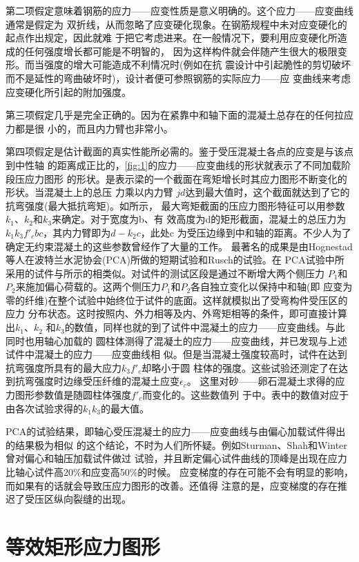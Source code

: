 \documentclass[12pt,a4paper]{book}
\begin{document}
第二项假定意味着钢筋的应力——应变性质是意义明确的。这个应力——应变曲线通常是假定为
双折线，从而忽略了应变硬化现象。在钢筋规程中未对应变硬化的起点作出规定，因此就难
于把它考虑进来。在一般情况下，要利用应变硬化所造成的任何强度增长都可能是不明智的，
因为这样构件就会伴随产生很大的极限变形。而当强度的增大可能造成不利情况时(例如在抗
震设计中引起脆性的剪切破坏而不是延性的弯曲破坏时)，设计者便可参照钢筋的实际应力——应
变曲线来考虑应变硬化所引起的附加强度。

第三项假定几乎是完全正确的。因为在紧靠中和轴下面的混凝土总存在的任何拉应力都是很
小的，而且内力臂也非常小。

第四项假定是估计截面的真实性能所必需的。鉴于受压混凝土各点的应变是与该点到中性轴
的距离成正比的，\cref{fig:1}的应力——应变曲线的形状就表示了不同加载阶段压应力图形
的形状。是表示梁的一个截面在弯矩增长时其应力图形不断变化的形状。当混凝土上的总压
力乘以内力臂 $jd$达到最大值时，这个截面就达到了它的抗弯强度(最大抵抗弯矩)。如所示，
最大弯矩截面的压应力图形特征可以用参数$k_1$、$k_2$和$k_3$来确定。对于宽度为b、有
效高度为d的矩形截面，混凝土的总压力为$k_1k_3f'_cbc$，其内力臂即为$d-k_2c$，此处c
为受压边缘到中和轴的距离。不少人为了确定无约束混凝土的这些参数曾经作了大量的工作。
最著名的成果是由Hognestad等人在波特兰水泥协会(PCA)所做的短期试验和Rusch的试验。在
PCA试验中所采用的试件与所示的相类似。对试件的测试区段是通过不断增大两个侧压力
$P_1$和$P_2$来施加偏心荷载的。这两个侧压力$P_1$和$P_2$各自独立变化以保持中和轴(即
应变为零的纤维)在整个试验中始终位于试件的底面。这样就模拟出了受弯构件受压区的应力
分布状态。这时按照内、外力相等及内、外弯矩相等的条件，即可直接计算出$k_1$、$k_2$
和$k_3$的数值，同样也就的到了试件中混凝土的应力——应变曲线。与此同时也用轴心加载的
圆柱体测得了混凝土的应力——应变曲线，并已发现与上述试件中混凝土的应力——应变曲线相
似。但是当混凝土强度较高时，试件在达到抗弯强度所具有的最大应力$k_3f'_c$却略小于圆
柱体的强度。这些试验还测定了在达到抗弯强度时边缘受压纤维的混凝土应变$\epsilon_c$。
这里对砂——卵石混凝土求得的应力图形参数值是随圆柱体强度$f'_c$而变化的。这些数值列
于中。表中的数值对应于由各次试验求得的$k_1k_3$的最大值。

PCA的试验结果，即轴心受压混凝土的应力——应变曲线与由偏心加载试件得出的结果极为相似
的这个结论，不时为人们所怀疑。例如Sturman、Shah和Winter曾对偏心和轴压加载试件做过
试验，并且断定偏心试件曲线的顶峰是出现在应力比轴心试件高20\%和应变高50\%的时候。
应变梯度的存在可能不会有明显的影响，而如果有的话就会导致压应力图形的改善。还值得
注意的是，应变梯度的存在推迟了受压区纵向裂缝的出现。

\section{等效矩形应力图形}
\end{document}
